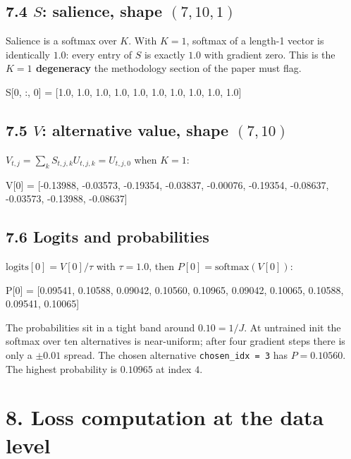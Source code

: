 \documentclass[11pt,a4paper]{article}
\begin{document}
\subsection*{7.4 $S$: salience, shape $(7, 10, 1)$}

Salience is a softmax over $K$. With $K = 1$, softmax of a length-1
vector is identically $1.0$: every entry of $S$ is exactly $1.0$ with
gradient zero. This is the \textbf{$K = 1$ degeneracy} the methodology
section of the paper must flag.

\begin{code}
S[0, :, 0] = [1.0, 1.0, 1.0, 1.0, 1.0, 1.0, 1.0, 1.0, 1.0, 1.0]
\end{code}

\subsection*{7.5 $V$: alternative value, shape $(7, 10)$}

$V_{t, j} = \sum_k S_{t, j, k} U_{t, j, k} = U_{t, j, 0}$ when
$K = 1$:

\begin{code}
V[0] =
[-0.13988, -0.03573, -0.19354, -0.03837, -0.00076,
 -0.19354, -0.08637, -0.03573, -0.13988, -0.08637]
\end{code}

\subsection*{7.6 Logits and probabilities}

$\text{logits}[0] = V[0] / \tau$ with $\tau = 1.0$, then
$P[0] = \text{softmax}(V[0])$:

\begin{code}
P[0] =
[0.09541, 0.10588, 0.09042, 0.10560, 0.10965,
 0.09042, 0.10065, 0.10588, 0.09541, 0.10065]
\end{code}

The probabilities sit in a tight band around $0.10 = 1/J$. At
untrained init the softmax over ten alternatives is near-uniform;
after four gradient steps there is only a $\pm 0.01$ spread. The
chosen alternative \texttt{chosen\_idx = 3} has $P = 0.10560$. The
highest probability is $0.10965$ at index $4$.

\section*{8. Loss computation at the data level}
\end{document}

